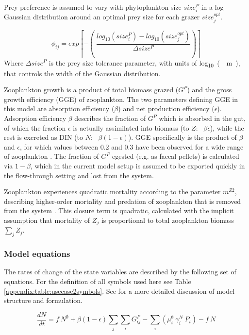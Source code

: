 \documentclass[journal abbreviations, manuscript]{copernicus}
\begin{document}
Prey preference is assumed to vary with phytoplankton size $size_i^{P}$ in a log-Gaussian distribution around an optimal prey size for each grazer $size_j^{opt}$.

\begin{equation}
    \phi_{ij} = exp \left[ -\left( \ \frac{ log_{10}(size_i^{P}) - log_{10}(size_j^{opt}) }{ \Delta size^{P} } \right) \right]
\end{equation}
Where $\Delta size^{P}$ is the prey size tolerance parameter, with units of \unit{log_{10}(\mu m)}, that controls the width of the Gaussian distribution.

Zooplankton growth is a product of total biomass grazed ($G^P$) and the gross growth efficiency (GGE) of zooplankton. The two parameters defining GGE in this model are absorption efficiency ($\beta$) and net production efficiency ($\epsilon$). Adsorption efficiency $\beta$ describes the fraction of $G^P$ which is absorbed in the gut, of which the fraction $\epsilon$ is actually assimilated into biomass (to $Z$: \ $\beta \epsilon$), while the rest is excreted as DIN (to $N$: \ $\beta (1-\epsilon)$). GGE specifically is the product of $\beta$ and $\epsilon$, for which values between 0.2 and 0.3 have been observed for a wide range of zooplankton  \citep{Straile1997GrossGroup}. The fraction of $G^P$ egested (e.g. as faecal pellets) is calculated via $1-\beta$, which in the current model setup is assumed to be exported quickly in the flow-through setting and lost from the system. 

Zooplankton experiences quadratic mortality according to the parameter $m^{Z2}$, describing higher-order mortality and predation of zooplankton that is removed from the system \citep{Edwards2000TheModels}. This closure term is quadratic, calculated with the implicit assumption that mortality of $Z_j$ is proportional to total zooplankton biomass $\sum_{j} Z_j$.

\clearpage
\subsubsection{Model equations}
The rates of change of the state variables are described by the following set of equations. For the definition of all symbols used here see Table \ref{appendix:table:usecase2symbols}.
See \citet{Banas2011b} for a more detailed discussion of model structure and formulation. 

\begin{equation}
    \frac{d N}{d t} = 
    f \ N^\emptyset %
    +  \beta (1 - \epsilon) \sum_{j} \sum_{i} G_{ij}^P %
    - \sum_{i} ( \mu_i^{\emptyset} \ \gamma_i^N \ P_i) %
    - f \ N
\end{equation}
\end{document}
